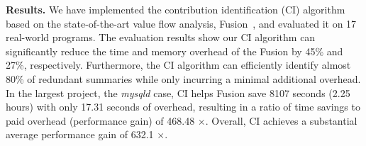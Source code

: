 

\textbf{Results.}
We have implemented the contribution identification (CI) algorithm based on the state-of-the-art value flow analysis, Fusion~\cite{shi2021path}, and evaluated it on 17 real-world programs.
The evaluation results show our CI algorithm can significantly reduce the time and memory overhead of the Fusion by 45\% and 27\%, respectively. 
Furthermore, the CI algorithm can efficiently identify almost 80\% of redundant summaries while only incurring a minimal additional overhead.
In the largest project, the \textit{mysqld} case, CI helps Fusion save 8107 seconds (2.25 hours) with only 17.31 seconds of overhead, resulting in a ratio of time savings to paid overhead (performance gain) of 468.48 $\times$. Overall, CI achieves a substantial average performance gain of 632.1 $\times$.


